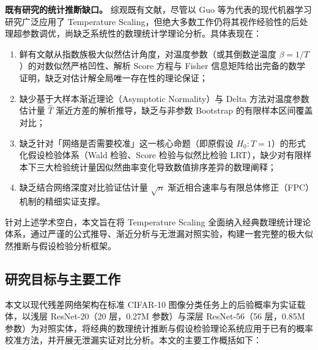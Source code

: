 \textbf{既有研究的统计推断缺口。}
综观既有文献，尽管以 Guo 等为代表的现代机器学习研究广泛应用了 Temperature Scaling，但绝大多数工作仍将其视作经验性的后处理超参数调优，尚缺乏系统性的数理统计学理论分析。具体表现在：
\begin{enumerate}
\item 鲜有文献从指数族极大似然估计角度，对温度参数（或其倒数逆温度 $\beta=1/T$）的对数似然严格凹性、解析 Score 方程与 Fisher 信息矩阵给出完备的数学证明，缺乏对估计解全局唯一存在性的理论保证；
\item 缺少基于大样本渐近理论（Asymptotic Normality）与 Delta 方法对温度参数估计量 $\hat T$ 渐近方差的解析推导，缺乏与非参数 Bootstrap 的有限样本区间覆盖对比；
\item 缺乏针对「网络是否需要校准」这一核心命题（即原假设 $H_0: T=1$）的形式化假设检验体系（Wald 检验、Score 检验与似然比检验 LRT），缺少对有限样本下三大检验统计量因似然曲率变化导致数值排序差异的数理阐释；
\item 缺乏结合网络深度对比验证估计量 $\sqrt{n}$ 渐近相合速率与有限总体修正（FPC）机制的精细实证支撑。
\end{enumerate}
针对上述学术空白，本文旨在将 Temperature Scaling 全面纳入经典数理统计理论体系，通过严谨的公式推导、渐近分析与无泄漏对照实验，构建一套完整的极大似然推断与假设检验分析框架。

\subsection{研究目标与主要工作}

本文以现代残差网络架构在标准 CIFAR-10 图像分类任务上的后验概率为实证载体，以浅层 ResNet-20（20 层，0.27M 参数）与深层 ResNet-56（56 层，0.85M 参数）为对照实体，将经典的数理统计推断与假设检验理论系统应用于已有的概率校准方法，并开展无泄漏实证对比分析。本文的主要工作概括如下：

